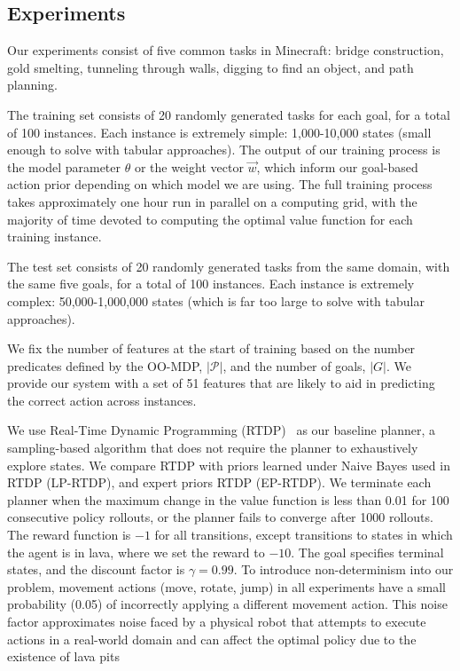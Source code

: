 \documentclass[11pt]{article}
\begin{document}
\subsection{Experiments}
Our experiments consist of five common tasks in Minecraft:
bridge construction, gold smelting, tunneling through
walls, digging to find an object, and path planning.

The training set consists of 20 randomly generated tasks for each goal, for a total of 100 instances. Each instance is extremely simple: 1,000-10,000 states (small enough to solve with tabular approaches). The output of our training process is the model parameter $\theta$ or the weight vector $\vec{w}$, which inform our goal-based action prior depending on which model we are using. The full training process takes approximately one hour run in parallel on a computing grid, with the majority of time devoted to computing the optimal value function for each training instance.

The test set consists of 20 randomly generated tasks from the same domain, with the same five goals, for a total of 100 instances. Each instance is extremely complex: 50,000-1,000,000 states (which is far too large to solve with tabular approaches).

We fix the number of features at the start of training based on the number
predicates defined by the OO-MDP, $|\mathcal{P}|$, and the number of goals, $|G|$.
We provide our system with a set of 51 features that are likely to aid in predicting the correct action across instances.

We use Real-Time Dynamic Programming (RTDP)~\cite{barto95} as our
baseline planner, a sampling-based algorithm that does not require the
planner to exhaustively explore states. We compare RTDP with
priors learned under Naive Bayes used in RTDP (LP-RTDP), and expert priors RTDP (EP-RTDP).
We terminate each planner when the maximum change in
the value function is less than 0.01 for 100 consecutive policy
rollouts, or the planner fails to converge after 1000 rollouts.  The
reward function is $-1$ for all transitions, except transitions to
states in which the agent is in lava, where we set the reward to
$-10$. The goal specifies terminal states, and the discount factor is
$\gamma = 0.99$.  To introduce non-determinism into our problem,
movement actions (move, rotate, jump) in all experiments have a small
probability (0.05) of incorrectly applying a different movement
action.  This noise factor approximates noise faced by a physical
robot that attempts to execute actions in a real-world domain and
can affect the optimal policy due to the existence of lava pits
\end{document}
